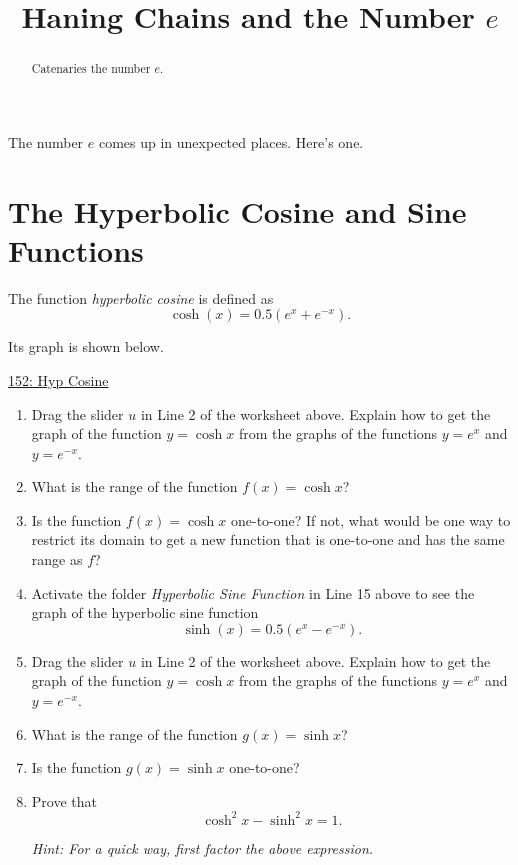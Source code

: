 \documentclass{ximera}
\title{Haning Chains and the Number $e$}
\begin{document}
\begin{abstract}
Catenaries the number $e$.
\end{abstract}
\maketitle


The number $e$ comes up in unexpected places. Here's one.

\section{The Hyperbolic Cosine and Sine Functions}

The function \emph{hyperbolic cosine} is defined as
\[
    \cosh(x) = 0.5(e^x + e^{-x}  ).
\]

Its graph is shown below.

\begin{onlineOnly}
    \begin{center}
\end{center}
\end{onlineOnly}

\href{https://www.desmos.com/calculator/nubdwzgsa9}{152: Hyp Cosine}

\begin{enumerate}
\item Drag the slider $u$ in Line 2 of the worksheet above. Explain how to get the graph of the function $y=\cosh x$ from the graphs of the functions $y=e^x$ and $y=e^{-x}$.

\begin{freeResponse}
\end{freeResponse}

\item What is the range of the function $f(x)=\cosh x$?

\item Is the function $f(x)=\cosh x$ one-to-one? If not, what would be one way to restrict its domain to get a new function that is one-to-one and has the same range as $f$?

\item Activate the folder \emph{Hyperbolic Sine Function} in Line 15 above to see the graph of the hyperbolic sine function
\[
   \sinh(x) = 0.5(e^x - e^{-x}  ).
\]
\item Drag the slider $u$ in Line 2 of the worksheet above. Explain how to get the graph of the function $y=\cosh x$ from the graphs of the functions $y=e^x$ and $y=e^{-x}$.
\begin{freeResponse}
\end{freeResponse}

\item What is the range of the function $g(x)=\sinh x$?

\item Is the function $g(x)=\sinh x$ one-to-one?

\item Prove that 
\[
      \cosh^2x - \sinh^2x = 1.
\]

\emph{Hint: For a quick way, first factor the above expression.}


\end{enumerate}
\end{document}
